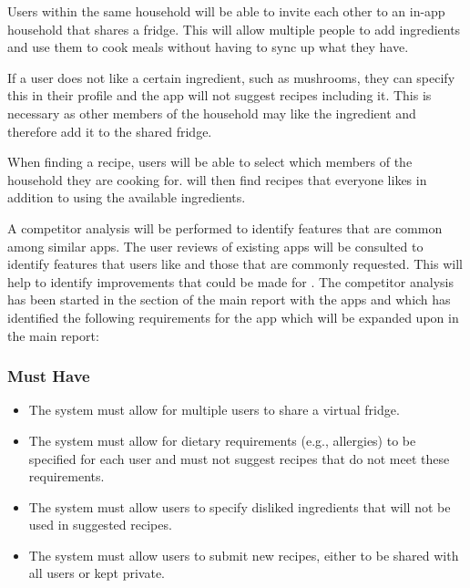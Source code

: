 \documentclass[../CHEFCookingHelperForEveryonesFridge.tex]{subfiles}
\begin{document}
Users within the same household will be able to invite each other to an in-app household that shares a fridge.
This will allow multiple people to add ingredients and use them to cook meals without having to sync up
what they have.

If a user does not like a certain ingredient, such as mushrooms, they can specify this in their profile and
the \chef{} app will not suggest recipes including it. This is necessary as other members of the household
may like the ingredient and therefore add it to the shared fridge.

When finding a recipe, users will be able to select which members of the household they are cooking for.
\chef{} will then find recipes that everyone likes in addition to using the available ingredients.

A competitor analysis will be performed to identify features that are common among similar apps. The user reviews of existing apps
will be consulted to identify features that users like and those that are commonly requested. This will help to identify
improvements that could be made for \chef{}. The competitor analysis has been started in the 
section of the main report with the apps \cite{myfridgefood_myfridgefood_nodate} and \cite{supercook_supercook_nodate} which has identified the following
requirements for the \chef{} app which will be expanded upon in the main report:

\subsubsection{Must Have}
\begin{itemize}
    \item The system must allow for multiple users to share a virtual fridge.
    \item The system must allow for dietary requirements (e.g., allergies) to be specified for each user and must not suggest recipes that do not meet these requirements.
    \item The system must allow users to specify disliked ingredients that will not be used in suggested recipes.
    \item The system must allow users to submit new recipes, either to be shared with all users or kept private.
\end{itemize}
\end{document}
